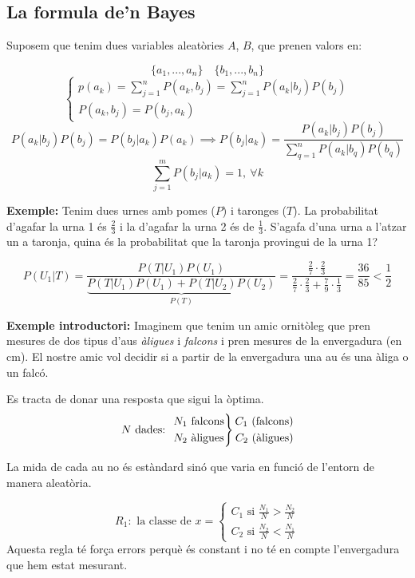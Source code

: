 \documentclass[a4paper]{article}
\begin{document}
\subsection{La formula de'n Bayes}

Suposem que tenim dues variables aleatòries $A$, $B$, que prenen valors en:

$$
\{ a_1, ..., a_n \}\quad \{ b_1, ..., b_n \}
$$
$$
\begin{cases}
p(a_k) = \sum_{j=1}^n P(a_k, b_j) = \sum_{j=1}^n P(a_k | b_j) P(b_j) \\
P(a_k, b_j) = P(b_j, a_k)
\end{cases}
$$
$$
P(a_k | b_j) P(b_j) = P(b_j | a_k) P(a_k) \implies
\boxed{P(b_j | a_k) = \frac{P(a_k | b_j) P(b_j)}{\sum_{q=1}^n P(a_k | b_q) P(b_q)}}
$$
$$
\sum_{j=1}^m P(b_j | a_k) = 1,\ \forall k 
$$

\textbf{Exemple:} Tenim dues urnes amb pomes ($P$) i taronges ($T$). La probabilitat d'agafar la urna 1 és $\frac{2}{3}$ i la d'agafar la urna 2 és de $\frac{1}{3}$. S'agafa d'una urna a l'atzar un a taronja, quina és la probabilitat que la taronja provingui de la urna 1?

$$
P(U_1|T) =  \frac{P(T|U_1) P(U_1)}{\underbrace{P(T|U_1)P(U_1) + P(T|U_2)P(U_2)}_{P(T)}} =
\frac{\frac{2}{7} · \frac{2}{3}}{\frac{2}{7}·\frac{2}{3} + \frac{7}{9}·\frac{1}{3}} =
\frac{36}{85} < \frac{1}{2}
$$

\textbf{Exemple introductori:} Imaginem que tenim un amic ornitòleg que pren mesures de dos tipus d'aus \emph{àligues} i \emph{falcons} i pren mesures de la envergadura (en cm). El nostre amic vol decidir si a partir de la envergadura una au és una àliga o un falcó. 

Es tracta de donar una resposta que sigui la òptima. 
$$
N \text{ dades: }
\begin{rcases*}
N_1 \text{ falcons} \\
N_2 \text{ àligues}
\end{rcases*}
\begin{aligned}
C_1 \text{ (falcons)} \\
C_2 \text{ (àligues)}
\end{aligned}
$$

La mida de cada au no és estàndard sinó que varia en funció de l'entorn de manera aleatòria. 

$$
R_1: \text{ la classe de } x = 
\begin{cases}
C_1 \text{ si } \frac{N_1}{N} > \frac{N_2}{N} \\
C_2 \text{ si } \frac{N_2}{N} < \frac{N_1}{N}
\end{cases}
$$ 
Aquesta regla té força errors perquè és constant i no té en compte l'envergadura que hem estat mesurant.
\end{document}
